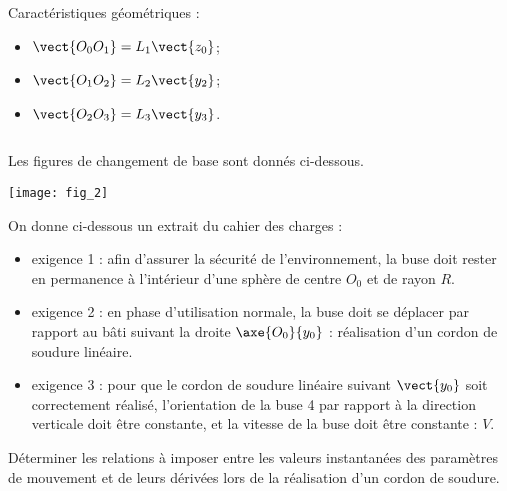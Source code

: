 \begin{multicols}{2}
\begin{multicols}{2}
 \noindent  Caractéristiques géométriques :
\begin{itemize}
\item $\vect{O_0O_1} = L_1\vect{z_0}$;
\item $\vect{O_1O_2} = L_2\vect{y_2}$;
\item $\vect{O_2O_3} = L_3\vect{y_3}$.
\end{itemize}
$\quad$


\end{multicols}


Les figures de changement de base sont donnés ci-dessous.
\begin{center}
\texttt{[image: fig\_2]}
\end{center}

\noindent On donne ci-dessous un extrait du cahier des charges :
\begin{itemize}
\item exigence 1 : afin d’assurer la sécurité de l’environnement, la buse doit rester en permanence à l’intérieur
d’une sphère de centre $O_0$ et de rayon $R$.
\item exigence 2 : en phase d’utilisation normale, la buse doit se déplacer par rapport au bâti suivant la droite $\axe{O_0}{y_0}$ : réalisation d’un cordon de soudure linéaire.
\item exigence 3 : pour que le cordon de soudure linéaire suivant $\vect{y_0}$ soit correctement réalisé, l’orientation de la
buse 4 par rapport à la direction verticale doit être constante, et la vitesse de la buse doit être 
constante : $V$.
\end{itemize}

\begin{obj}
Déterminer les relations à imposer entre les valeurs instantanées des paramètres de mouvement et
de leurs dérivées lors de la réalisation d’un cordon de soudure.
\end{obj}






\ifprof
\else
\end{multicols}
\fi


